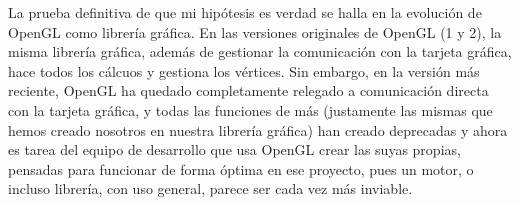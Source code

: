 La prueba definitiva de que mi hipótesis es verdad se halla en la evolución de OpenGL como librería gráfica. En las versiones originales de OpenGL (1 y 2), la misma librería gráfica, además de gestionar la comunicación con la tarjeta gráfica, hace todos los cálcuos y gestiona los vértices. Sin embargo, en la versión más reciente, OpenGL ha quedado completamente relegado a comunicación directa con la tarjeta gráfica, y todas las funciones de más (justamente las mismas que hemos creado nosotros en nuestra librería gráfica) han creado deprecadas y ahora es tarea del equipo de desarrollo que usa OpenGL crear las suyas propias, pensadas para funcionar de forma óptima en ese proyecto, pues un motor, o incluso librería, con uso general, parece ser cada vez más inviable. 
